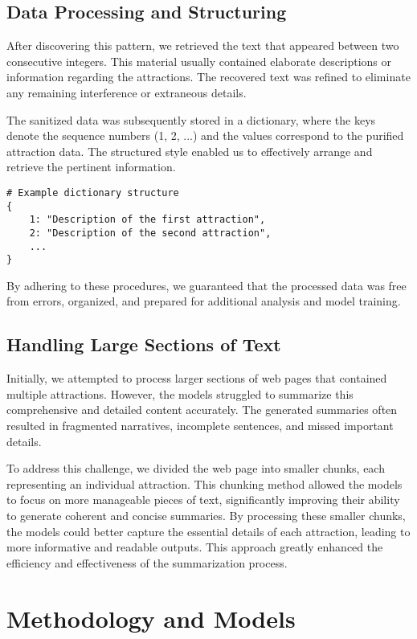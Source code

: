 \documentclass[conference]{IEEEtran}
\begin{document}
    \subsection{Data Processing and Structuring}
    After discovering this pattern, we retrieved the text that appeared between two consecutive integers. This material usually contained elaborate descriptions or information regarding the attractions. The recovered text was refined to eliminate any remaining interference or extraneous details.

    The sanitized data was subsequently stored in a dictionary, where the keys denote the sequence numbers (1, 2, ...) and the values correspond to the purified attraction data. The structured style enabled us to effectively arrange and retrieve the pertinent information.

    \begin{verbatim}
# Example dictionary structure
{
    1: "Description of the first attraction",
    2: "Description of the second attraction",
    ...
}
    \end{verbatim}

    By adhering to these procedures, we guaranteed that the processed data was free from errors, organized, and prepared for additional analysis and model training.

    \subsection{Handling Large Sections of Text}
    Initially, we attempted to process larger sections of web pages that contained multiple attractions. However, the models struggled to summarize this comprehensive and detailed content accurately. The generated summaries often resulted in fragmented narratives, incomplete sentences, and missed important details.

    To address this challenge, we divided the web page into smaller chunks, each representing an individual attraction. This chunking method allowed the models to focus on more manageable pieces of text, significantly improving their ability to generate coherent and concise summaries. By processing these smaller chunks, the models could better capture the essential details of each attraction, leading to more informative and readable outputs. This approach greatly enhanced the efficiency and effectiveness of the summarization process.


\section{Methodology and Models}
\end{document}
